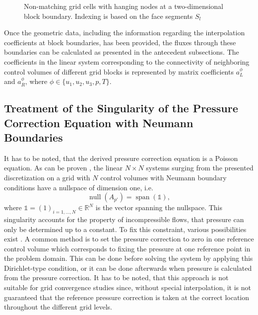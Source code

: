 \begin{figure}
  \centering
  
  \caption{Non-matching grid cells with hanging nodes at a two-dimensional block boundary. Indexing is based on the face segments $S_l$}
  \label{fig:nonmatching}
\end{figure}

Once the geometric data, including the information regarding the interpolation coefficients at block boundaries, has been provided, the fluxes through these boundaries can be calculated as presented in the antecedent subsections. The coefficients in the linear system corresponding to the connectivity of neighboring control volumes of different grid blocks is represented by matrix coefficients \(a_L^{\phi}\) and \(a_R^{\phi}\), where \(\phi \in \{u_1,u_2,u_3,p,T\}\).

\subsection{Treatment of the Singularity of the Pressure Correction Equation with Neumann Boundaries}
\label{sec:singularitytreatment}

It has to be noted, that the derived pressure correction equation is a Poisson equation. As can be proven \cite{hackbusch96}, the linear \(N \times N\) systems surging from the presented discretization on a grid with \(N\) control volumes with Neumann boundary conditions have a nullspace of dimension one, i.e.
\begin{displaymath}
  \operatorname{null}(A_{p'}) = \operatorname{span}(\mathbb{1}),
\end{displaymath}
where \(\mathbb{1} = (1)_{i = 1,\dots,N} \in \mathbb{R}^N\) is the vector spanning the nullspace. This singularity accounts for the property of incompressible flows, that pressure can only be determined up to a constant. To fix this constraint, various possibilities exist \cite{ferziger02}. A common method is to set the pressure correction to zero in one reference control volume which corresponds to fixing the pressure at one reference point in the problem domain. This can be done before solving the system by applying this Dirichlet-type condition, or it can be done afterwards when pressure is calculated from the pressure correction. It has to be noted, that this approach is not suitable for grid convergence studies since, without special interpolation, it is not guaranteed that the reference pressure correction is taken at the correct location throughout the different grid levels.

